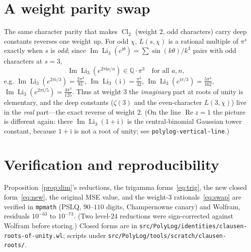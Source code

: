 \documentclass[11pt]{article}
\DeclareMathOperator{\Li}{Li}
\DeclareMathOperator{\Cl}{Cl}
\newcommand{\iu}{\mathrm{i}}
\newcommand{\Imag}{\operatorname{Im}}
\newcommand{\Real}{\operatorname{Re}}
\theoremstyle{plain}\newtheorem{theorem}{Theorem}\newtheorem{proposition}[theorem]{Proposition}
\theoremstyle{remark}\newtheorem{remark}[theorem]{Remark}
\begin{document}
\section{A weight parity swap}
The same character parity that makes $\Cl_2$ (weight $2$, odd characters) carry deep constants reverses one
weight up. For odd $\chi$, $L(s,\chi)$ is a rational multiple of $\pi^s$ exactly when $s$ is \emph{odd};
since $\Imag\Li_3(e^{\iu\theta})=\sum\sin(k\theta)/k^3$ pairs with odd characters at $s=3$,
\begin{equation}\label{eq:swap}
  \Imag\Li_3(e^{2\pi\iu a/n})\in\mathbb Q\cdot\pi^3\quad\text{for all }a,n,
\end{equation}
e.g. $\Imag\Li_3(e^{2\pi\iu/3})=\tfrac{2\pi^3}{81}$, $\Imag\Li_3(\iu)=\tfrac{\pi^3}{32}$,
$\Imag\Li_3(e^{\iu\pi/3})=\tfrac{5\pi^3}{162}$, $\Imag\Li_3(e^{2\pi\iu/5})=\tfrac{4\pi^3}{125}$. Thus at
weight $3$ the \emph{imaginary} part at roots of unity is elementary, and the deep constants
($\zeta(3)$ and the even-character $L(3,\chi)$) live in the \emph{real} part---the exact reverse of weight
$2$. (On the line $\Real z=1$ the picture is different again: there $\Imag\Li_3(1+\iu)$ is the central-binomial
Gaussian tower constant, because $1+\iu$ is not a root of unity; see \texttt{polylog-vertical-line}.)

\section{Verification and reproducibility}
Proposition~\ref{prop:dim}'s reductions, the trigamma forms~\eqref{eq:trig}, the new closed
form~\eqref{eq:new}, the original MSE value, and the weight-$3$ rationals~\eqref{eq:swap} are verified in
\texttt{mpmath} (PSLQ, $90$--$110$ digits, Champernowne canary) and Wolfram, residuals
$10^{-63}$ to $10^{-73}$. (Two level-$24$ reductions were sign-corrected against Wolfram before storing.)
Closed forms are in \texttt{src/PolyLog/identities/clausen-roots-of-unity.wl}; scripts under
\texttt{src/PolyLog/tools/scratch/clausen-roots/}.
\end{document}

